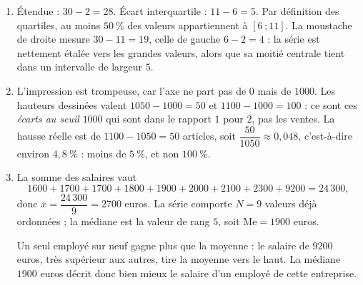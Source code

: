 \begin{enumerate}
  \item Étendue : $30 - 2 = 28$. Écart interquartile : $11 - 6 = 5$. Par définition
    des quartiles, au moins $50~\%$ des valeurs appartiennent à $[6\,;11]$. La
    moustache de droite mesure $30 - 11 = 19$, celle de gauche $6 - 2 = 4$ : la
    série est nettement étalée vers les grandes valeurs, alors que sa moitié
    centrale tient dans un intervalle de largeur $5$.

  \item L'impression est trompeuse, car l'axe ne part pas de $0$ mais de $1000$.
    Les hauteurs dessinées valent $1050 - 1000 = 50$ et $1100 - 1000 = 100$ : ce
    sont ces \emph{écarts au seuil} $1000$ qui sont dans le rapport $1$ pour $2$,
    pas les ventes. La hausse réelle est de $1100 - 1050 = 50$ articles, soit
    $\dfrac{50}{1050} \approx 0{,}048$, c'est-à-dire environ $4{,}8~\%$ : moins de
    $5~\%$, et non $100~\%$.

  \item La somme des salaires vaut
    \[
      1600+1700+1700+1800+1900+2000+2100+2300+9200 = 24\,300,
    \]
    donc $\overline{x} = \dfrac{24\,300}{9} = 2700$ euros. La série comporte
    $N = 9$ valeurs déjà ordonnées ; la médiane est la valeur de rang $5$, soit
    $\mathrm{Me} = 1900$ euros.

    Un seul employé sur neuf gagne plus que la moyenne : le salaire de $9200$
    euros, très supérieur aux autres, tire la moyenne vers le haut. La médiane
    $1900$ euros décrit donc bien mieux le salaire d'un employé de cette
    entreprise.
\end{enumerate}


\newpage
\fi
